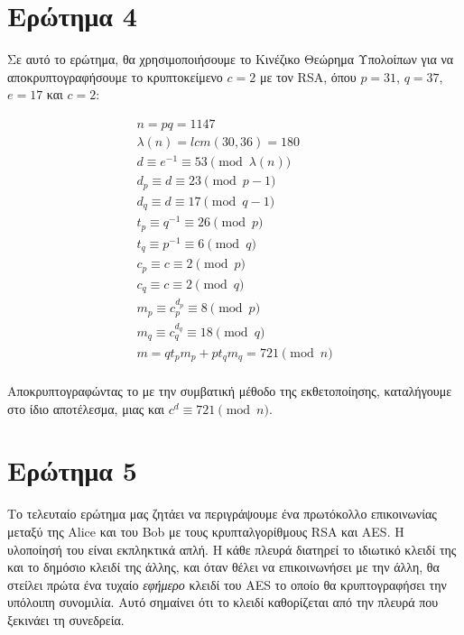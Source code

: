 \documentclass{article}
\begin{document}
\section*{Ερώτημα 4}

Σε αυτό το ερώτημα, θα χρησιμοποιήσουμε το Κινέζικο Θεώρημα Υπολοίπων για να αποκρυπτογραφήσουμε το κρυπτοκείμενο $c = 2$ με τον RSA, όπου $p = 31$, $q = 37$, $e = 17$ και $c = 2$:

\begin{gather*}
n = pq = 1147 \\
\lambda(n) = lcm(30, 36) = 180 \\
d \equiv e^{-1} \equiv 53 \pmod{\lambda(n)} \\
d_p \equiv d \equiv 23 \pmod {p - 1} \\
d_q \equiv d \equiv 17 \pmod {q - 1} \\
t_p \equiv q^{-1} \equiv 26 \pmod p \\
t_q \equiv p^{-1} \equiv 6 \pmod q \\
c_p \equiv c \equiv 2 \pmod p \\
c_q \equiv c \equiv 2 \pmod q \\
m_p \equiv c_p^{d_p} \equiv 8 \pmod p \\
m_q \equiv c_q^{d_q} \equiv 18 \pmod q \\
m = qt_pm_p + pt_qm_q = 721 \pmod n \\
\end{gather*}

Αποκρυπτογραφώντας το με την συμβατική μέθοδο της εκθετοποίησης, καταλήγουμε στο ίδιο αποτέλεσμα, μιας και $c^d \equiv 721 \pmod n$.

\section*{Ερώτημα 5}

Το τελευταίο ερώτημα μας ζητάει να περιγράψουμε ένα πρωτόκολλο επικοινωνίας μεταξύ της Alice και του Bob με τους κρυπταλγορίθμους RSA και AES. Η υλοποίησή του είναι εκπληκτικά απλή. Η κάθε πλευρά διατηρεί το ιδιωτικό κλειδί της και το δημόσιο κλειδί της άλλης, και όταν θέλει να επικοινωνήσει με την άλλη, θα στείλει πρώτα ένα τυχαίο \emph{εφήμερο} κλειδί του AES το οποίο θα κρυπτογραφήσει την υπόλοιπη συνομιλία. Αυτό σημαίνει	ότι το κλειδί καθορίζεται από την πλευρά που ξεκινάει τη συνεδρεία.
\end{document}
